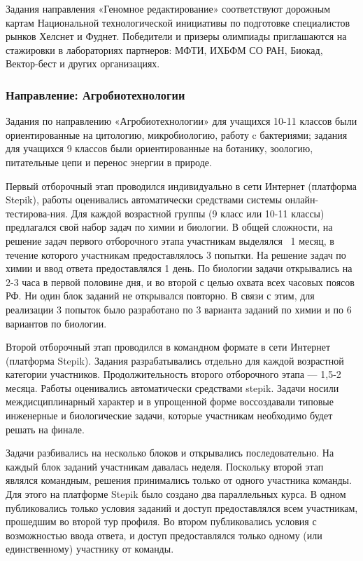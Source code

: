 Задания направления «Геномное редактирование» соответствуют дорожным картам Национальной технологической инициативы по подготовке специалистов рынков Хелснет и Фуднет. Победители и призеры олимпиады приглашаются на стажировки в лабораториях партнеров: МФТИ, ИХБФМ СО РАН, Биокад, Вектор-бест и других организациях. 

\subsubsection*{Направление: Агробиотехнологии}

Задания по направлению «Агробиотехнологии» для учащихся 10-11 классов были ориентированные на цитологию, микробиологию, работу c бактериями; задания для учащихся 9 классов были ориентированные на ботанику, зоологию, питательные цепи и перенос энергии в природе.   

Первый отборочный этап проводился индивидуально в сети Интернет (платформа Stepik), работы оценивались автоматически средствами системы онлайн-тестирова-ния. Для каждой возрастной группы (9 класс или 10-11 классы) предлагался свой набор задач по химии и биологии. В общей сложности, на решение задач первого отборочного этапа участникам выделялся ~1 месяц, в течение которого участникам предоставлялось 3 попытки. На решение задач по химии и ввод ответа предоставлялся 1 день. По биологии задачи открывались на 2-3 часа в первой половине дня, и во второй с целью охвата всех часовых поясов РФ. Ни один блок заданий не открывался повторно. В связи с этим, для реализации 3 попыток было  разработано по 3 варианта заданий по химии и по 6 вариантов по биологии. 
 
Второй отборочный этап проводился в командном формате в сети Интернет (платформа Stepik). Задания разрабатывались отдельно для каждой возрастной категории участников. Продолжительность второго отборочного этапа — 1,5-2 месяца. Работы оценивались автоматически средствами stepik. Задачи носили междисциплинарный характер и в упрощенной форме воссоздавали типовые инженерные и биологические задачи, которые участникам необходимо будет решать на финале.

Задачи разбивались на несколько блоков и открывались последовательно. На каждый блок заданий участникам давалась неделя. Поскольку второй этап являлся командным, решения принимались только от одного участника команды. Для этого на платформе Stepik было создано два параллельных курса. В одном публиковались только условия заданий и доступ предоставлялся всем участникам, прошедшим во второй тур профиля. Во втором публиковались условия с возможностью ввода ответа, и доступ предоставлялся только одному (или единственному) участнику от команды.

